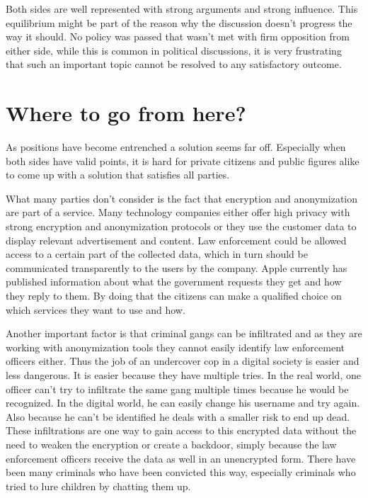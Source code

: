\documentclass[12pt]{article}
\begin{document}
Both sides are well represented with strong arguments and strong influence. This equilibrium might be part of the reason why the discussion doesn't progress the way it should. No policy was passed that wasn't met with firm opposition from either side, while this is common in political discussions, it is very frustrating that such an important topic cannot be resolved to any satisfactory outcome. \cite{roundtable}

\section*{Where to go from here?}

As positions have become entrenched a solution seems far off. Especially when both sides have valid points, it is hard for private citizens and public figures alike to come up with a solution that satisfies all parties.

What many parties don't consider is the fact that encryption and anonymization are part of a service. Many technology companies either offer high privacy with strong encryption and anonymization protocols or they use the customer data to display relevant advertisement and content. Law enforcement could be allowed access to a certain part of the collected data, which in turn should be communicated transparently to the users by the company. Apple currently has published information about what the government requests they get and how they reply to them. \cite{appleGovReq} By doing that the citizens can make a qualified choice on which services they want to use and how. 

Another important factor is that criminal gangs can be infiltrated and as they are working with anonymization tools they cannot easily identify law enforcement officers either. Thus the job of an undercover cop in a digital society is easier and less dangerous. It is easier because they have multiple tries. In the real world, one officer can't try to infiltrate the same gang multiple times because he would be recognized. In the digital world, he can easily change his username and try again. Also because he can't be identified he deals with a smaller risk to end up dead. These infiltrations are one way to gain access to this encrypted data without the need to weaken the encryption or create a backdoor, simply because the law enforcement officers receive the data as well in an unencrypted form. There have been many criminals who have been convicted this way, especially criminals who tried to lure children by chatting them up. \cite{bgrChildSuccess}
\end{document}

